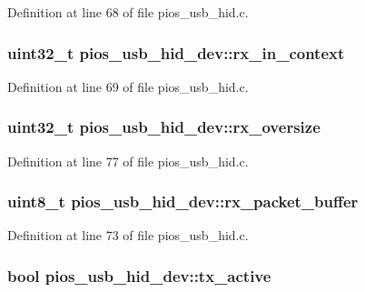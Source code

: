 \-Definition at line 68 of file pios\-\_\-usb\-\_\-hid.\-c.

\hypertarget{group___p_i_o_s___u_s_b___h_i_d_ga2ce875c5efa2b6b450f143818872513a}{
\subsubsection[{rx\-\_\-in\-\_\-context}]{\setlength{\rightskip}{0pt plus 5cm}uint32\-\_\-t {\bf pios\-\_\-usb\-\_\-hid\-\_\-dev\-::rx\-\_\-in\-\_\-context}}}\label{group___p_i_o_s___u_s_b___h_i_d_ga2ce875c5efa2b6b450f143818872513a}


\-Definition at line 69 of file pios\-\_\-usb\-\_\-hid.\-c.

\hypertarget{group___p_i_o_s___u_s_b___h_i_d_gaddc9bf1640b3a06aff88c4adaa6d3601}{
\subsubsection[{rx\-\_\-oversize}]{\setlength{\rightskip}{0pt plus 5cm}uint32\-\_\-t {\bf pios\-\_\-usb\-\_\-hid\-\_\-dev\-::rx\-\_\-oversize}}}\label{group___p_i_o_s___u_s_b___h_i_d_gaddc9bf1640b3a06aff88c4adaa6d3601}


\-Definition at line 77 of file pios\-\_\-usb\-\_\-hid.\-c.

\hypertarget{group___p_i_o_s___u_s_b___h_i_d_ga20fb92cd6b239abc72cb0ac8b93b11b4}{
\subsubsection[{rx\-\_\-packet\-\_\-buffer}]{\setlength{\rightskip}{0pt plus 5cm}uint8\-\_\-t {\bf pios\-\_\-usb\-\_\-hid\-\_\-dev\-::rx\-\_\-packet\-\_\-buffer}}}\label{group___p_i_o_s___u_s_b___h_i_d_ga20fb92cd6b239abc72cb0ac8b93b11b4}


\-Definition at line 73 of file pios\-\_\-usb\-\_\-hid.\-c.

\hypertarget{group___p_i_o_s___u_s_b___h_i_d_ga3c0deaac64c0f63bdb4a5cd41379bc23}{
\subsubsection[{tx\-\_\-active}]{\setlength{\rightskip}{0pt plus 5cm}bool {\bf pios\-\_\-usb\-\_\-hid\-\_\-dev\-::tx\-\_\-active}}}\label{group___p_i_o_s___u_s_b___h_i_d_ga3c0deaac64c0f63bdb4a5cd41379bc23}


